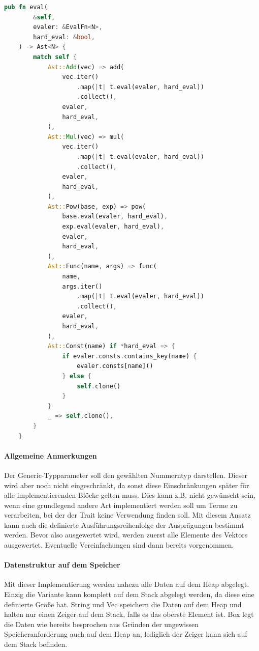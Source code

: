\documentclass[11pt,a4paper, ngerman]{article}
\begin{document}
\begin{lstlisting}[language=rust, caption={eval-Methode 1. Implementierung}]
pub fn eval(
        &self,
        evaler: &EvalFn<N>,
        hard_eval: &bool,
    ) -> Ast<N> {
        match self {
            Ast::Add(vec) => add(
                vec.iter()
                    .map(|t| t.eval(evaler, hard_eval))
                    .collect(),
                evaler,
                hard_eval,
            ),
            Ast::Mul(vec) => mul(
                vec.iter()
                    .map(|t| t.eval(evaler, hard_eval))
                    .collect(),
                evaler,
                hard_eval,
            ),
            Ast::Pow(base, exp) => pow(
                base.eval(evaler, hard_eval),
                exp.eval(evaler, hard_eval),
                evaler,
                hard_eval,
            ),
            Ast::Func(name, args) => func(
                name,
                args.iter()
                    .map(|t| t.eval(evaler, hard_eval))
                    .collect(),
                evaler,
                hard_eval,
            ),
            Ast::Const(name) if *hard_eval => {
                if evaler.consts.contains_key(name) {
                    evaler.consts[name]()
                } else {
                    self.clone()
                }
            }
            _ => self.clone(),
        }
    }
\end{lstlisting}

\paragraph{Allgemeine Anmerkungen} Der Generic-Typparameter  soll den gewählten Nummerntyp darstellen. Dieser wird aber noch nicht eingeschränkt, da sonst diese Einschränkungen später für alle implementierenden Blöcke gelten muss. Dies kann z.B. nicht gewünscht sein, wenn eine grundlegend andere Art implementiert werden soll um Terme zu verarbeiten, bei der der Trait  keine Verwendung finden soll. Mit diesem Ansatz kann auch die definierte Ausführungsreihenfolge der Ausprägungen bestimmt werden. Bevor also  ausgewertet wird, werden zuerst alle Elemente des Vektors ausgewertet. Eventuelle Vereinfachungen sind dann bereits vorgenommen.

\paragraph{Datenstruktur auf dem Speicher} Mit dieser Implementierung werden nahezu alle Daten auf dem Heap abgelegt. Einzig die Variante  kann komplett auf dem Stack abgelegt werden, da diese eine definierte Größe hat. String und Vec speichern die Daten auf dem Heap und halten nur einen Zeiger auf dem Stack, falls es das oberste Element ist. Box legt die Daten wie bereits besprochen aus Gründen der ungewissen Speicheranforderung auch auf dem Heap an, lediglich der Zeiger kann sich auf dem Stack befinden.
\end{document}
